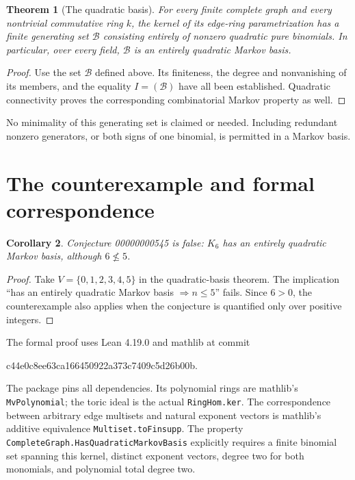 \documentclass[11pt,letterpaper]{article}
\newtheorem{theorem}{Theorem}
\newtheorem{corollary}[theorem]{Corollary}
\newcommand{\decl}[1]{{\small\nolinkurl{#1}}}
\begin{document}
\begin{theorem}[The quadratic basis]
For every finite complete graph and every nontrivial commutative ring $k$,
the kernel of its edge-ring parametrization has a finite generating set
$\mathcal B$ consisting entirely of nonzero quadratic pure binomials.
In particular, over every field, $\mathcal B$ is an entirely quadratic
Markov basis.
\end{theorem}
\begin{proof}
Use the set $\mathcal B$ defined above. Its finiteness, the degree and
nonvanishing of its members, and the equality $I=(\mathcal B)$ have all
been established. Quadratic connectivity proves the corresponding
combinatorial Markov property as well.
\end{proof}
No minimality of this generating set is claimed or needed. Including
redundant nonzero generators, or both signs of one binomial, is permitted
in a Markov basis.

\newpage
\section{The counterexample and formal correspondence}
\begin{corollary}
Conjecture 00000000545 is false: $K_6$ has an entirely quadratic Markov
basis, although $6\not\leq5$.
\end{corollary}
\begin{proof}
Take $V=\{0,1,2,3,4,5\}$ in the quadratic-basis theorem. The implication
``has an entirely quadratic Markov basis $\Rightarrow n\leq5$'' fails.
Since $6>0$, the counterexample also applies when the conjecture is
quantified only over positive integers.
\end{proof}

The formal proof uses Lean 4.19.0 and mathlib at commit
\begin{center}\small\ttfamily
c44e0c8ee63ca166450922a373c7409c5d26b00b.
\end{center}
The package pins all dependencies. Its polynomial rings are mathlib's
\decl{MvPolynomial}; the toric ideal is the actual \decl{RingHom.ker}.
The correspondence between arbitrary edge multisets and natural exponent
vectors is mathlib's additive equivalence \decl{Multiset.toFinsupp}.
The property \decl{CompleteGraph.HasQuadraticMarkovBasis} explicitly
requires a finite binomial set spanning this kernel, distinct exponent
vectors, degree two for both monomials, and polynomial total degree two.
\end{document}
